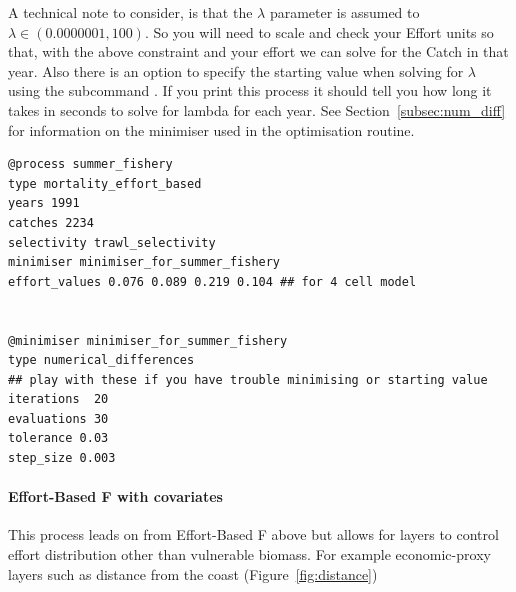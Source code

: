 A technical note to consider, is that the $\lambda$ parameter is assumed to $\lambda \in (0.0000001, 100)$. So you will need to scale and check your Effort units so that, with the above constraint and your effort we can solve for the Catch in that year. Also there is an option to specify the starting value when solving for $\lambda$ using the subcommand . If you print this process it should tell you how long it takes in seconds to solve for lambda for each year. See Section~\ref{subsec:num_diff} for information on the minimiser used in the optimisation routine.


{\small{\begin{verbatim}
@process summer_fishery
type mortality_effort_based
years 1991
catches 2234
selectivity trawl_selectivity
minimiser minimiser_for_summer_fishery
effort_values 0.076 0.089 0.219 0.104 ## for 4 cell model


@minimiser minimiser_for_summer_fishery
type numerical_differences
## play with these if you have trouble minimising or starting value
iterations	20 
evaluations 30
tolerance 0.03
step_size 0.003

\end{verbatim}}}


\paragraph{Effort-Based F with covariates}\label{para:effort_based_F_w_covars}
This process leads on from Effort-Based F above but allows for layers to control effort distribution other than vulnerable biomass. For example economic-proxy layers such as distance from the coast (Figure~\ref{fig:distance})

